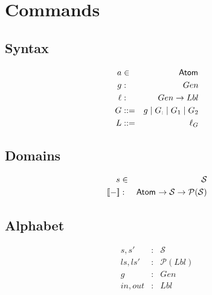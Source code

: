 \section{Commands}\label{sec:commands}



\subsection{Syntax}

\begin{eqnarray*}
   a &\in& \mathsf{Atom_{}}
\\ g &:& Gen
\\ \ell &:& Gen \rightarrow Lbl
\\ G &::=&  g \mid G_{:} \mid G_1 \mid G_2
\\ L &::=& \ell_G
\end{eqnarray*}


\subsection{Domains}
\begin{eqnarray*}
   s &\in& \mathcal S
\\ \sem{-} &:& \Atom{} \fun \mathcal S \fun \mathcal P(\mathcal S)
\end{eqnarray*}

\subsection{Alphabet}

\begin{eqnarray*}
   s, s' &:& \mathcal S
\\ ls, ls' &:& \mathcal P (Lbl)
\\ g &:& Gen
\\ in, out &:& Lbl
\end{eqnarray*}

